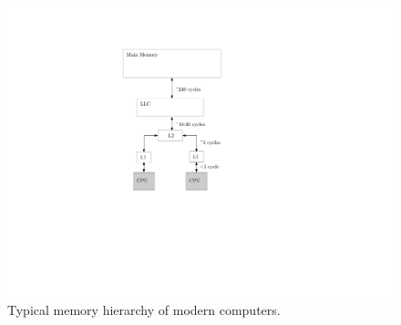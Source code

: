 \documentclass[12pt]{diicc}
\begin{document}
\begin{figure}[h!]
	\centering
		\includegraphics[scale=1]{cache}
	\caption{Typical memory hierarchy of modern computers.}
	\label{fig:cache}
\end{figure}
\end{document}
